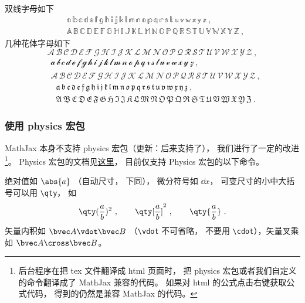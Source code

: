 双线字母如下
\begin{equation}
\begin{aligned}
&\mathbb{a\, b\, c\, d\, e\, f\, g\, h\, i\, j\, k\, l\, m\, n\, o\, p\, q\, r\, s\, t\, u\, v\, w\, x\, y\, z}~,\\
&\mathbb{A\, B\, C\, D\, E\, F\, G\, H\, I\, J\, K\, L\, M\, N\, O\, P\, Q\, R\, S\, T\, U\, V\, W\, X\, Y\, Z}~,
\end{aligned}
\end{equation}
几种花体字母如下
\begin{equation}
\mathcal{A\, B\, C\, D\, E\, F\, G\, H\, I\, J\, K\, L\, M\, N\, O\, P\, Q\, R\, S\, T\, U\, V\, W\, X\, Y\, Z}~,
\end{equation}
\begin{equation}
\begin{aligned}
&\mathscr{a\, b\, c\, d\, e\, f\, g\, h\, i\, j\, k\, l\, m\, n\, o\, p\, q\, r\, s\, t\, u\, v\, w\, x\, y\, z}~,\\
&\mathscr{A\, B\, C\, D\, E\, F\, G\, H\, I\, J\, K\, L\, M\, N\, O\, P\, Q\, R\, S\, T\, U\, V\, W\, X\, Y\, Z}~,
\end{aligned}
\end{equation}
\begin{equation}
\begin{aligned}
&\mathfrak{a\, b\, c\, d\, e\, f\, g\, h\, i\, j\, k\, l\, m\, n\, o\, p\, q\, r\, s\, t\, u\, v\, w\, x\, y\, z}~,\\
&\mathfrak{A\, B\, C\, D\, E\, F\, G\, H\, I\, J\, K\, L\, M\, N\, O\, P\, Q\, R\, S\, T\, U\, V\, W\, X\, Y\, Z}~.
\end{aligned}
\end{equation}

\subsubsection{使用 physics 宏包}
MathJax 本身不支持 physics 宏包（更新：后来支持了）， 我们进行了一定的改进\footnote{后台程序在把 tex 文件翻译成 html 页面时， 把 physics 宏包或者我们自定义的命令翻译成了 MathJax 兼容的代码。 如果对 html 的公式点击右键获取公式代码， 得到的仍然是兼容 MathJax 的代码。}。 Physics 宏包的文档见\href{http://mirrors.ibiblio.org/CTAN/macros/latex/contrib/physics/physics.pdf}{这里}， 目前仅支持 Physics 宏包的以下命令。

绝对值如 $\abs{a}$ （自动尺寸， 下同）， 微分符号如 $\dd{x}$， 可变尺寸的小中大括号可以用 \verb|\qty|， 如
\begin{equation}
\qty(\frac ab)^2~, \qquad \qty[\frac ab]^2~, \qquad \qty{ \frac ab}~.
\end{equation}
矢量内积如 $\bvec A \vdot \bvec B$ （\verb|\vdot| 不可省略， 不要用 \verb|\cdot|），矢量叉乘如 $\bvec A\cross\bvec B$。

